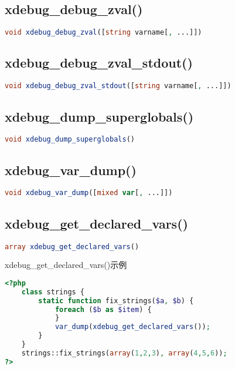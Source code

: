 \subsection{xdebug\_debug\_zval()}


\begin{lstlisting}[language=PHP]
void xdebug_debug_zval([string varname[, ...]])
\end{lstlisting}


\subsection{xdebug\_debug\_zval\_stdout()}


\begin{lstlisting}[language=PHP]
void xdebug_debug_zval_stdout([string varname[, ...]])
\end{lstlisting}


\subsection{xdebug\_dump\_superglobals()}



\begin{lstlisting}[language=PHP]
void xdebug_dump_superglobals()
\end{lstlisting}

\subsection{xdebug\_var\_dump()}



\begin{lstlisting}[language=PHP]
void xdebug_var_dump([mixed var[, ...]])
\end{lstlisting}


\subsection{xdebug\_get\_declared\_vars()}



\begin{lstlisting}[language=PHP]
array xdebug_get_declared_vars()
\end{lstlisting}



\begin{example}
xdebug\_get\_declared\_vars()示例
\begin{lstlisting}[language=PHP]
<?php
    class strings {
        static function fix_strings($a, $b) {
            foreach ($b as $item) {
            }
            var_dump(xdebug_get_declared_vars());
        }
    }
    strings::fix_strings(array(1,2,3), array(4,5,6));
?>
\end{lstlisting}
\end{example}

